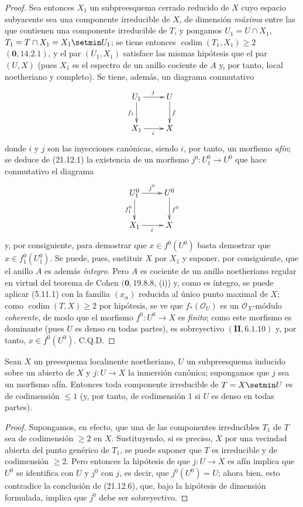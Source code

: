 \begin{proof}
Sea entonces $X_1$ un subpreesquema cerrado reducido de $X$ cuyo espacio subyacente
sea una componente irreducible de $X$, de dimensión \emph{máxima} entre las que
contienen una componente irreducible de $T$, y pongamos
$U_1=U\cap X_1$, $T_1=T\cap X_1=X_1\setmin U_1$; se tiene entonces
$\operatorname{codim}(T_1,X_1)\geq2$ $(\mathbf 0, 14.2.1)$, y el par $(U_1,X_1)$
satisface las mismas hipótesis que el par $(U,X)$ (pues $X_1$ es el espectro de un
anillo cociente de $A$ y, por tanto, local noetheriano y completo). Se tiene, además, un
diagrama conmutativo
\[
  \xymatrix{
    U_1 \ar[r]^j \ar[d]_{f_1} & U \ar[d]^f \\
    X_1 \ar[r]_i & X
  }
\]
donde $i$ y $j$ son las inyecciones canónicas, siendo $i$, por tanto, un morfismo \emph{afín}; se
deduce de (21.12.1) la existencia de un morfismo $j^0:U_1^0\to U^0$ que hace conmutativo el
diagrama
\[
  \xymatrix{
    U_1^0 \ar[r]^{j^0} \ar[d]_{f_1^0} & U^0 \ar[d]^{f^0} \\
    X_1 \ar[r]_i & X
  }
\]
y, por consiguiente, para demostrar que $x\in f^0(U^0)$ basta demostrar que
$x\in f_1^0(U_1^0)$. Se puede, pues, sustituir $X$ por $X_1$ y suponer, por consiguiente,
que el anillo $A$ es además \emph{íntegro}. Pero $A$ es cociente de un
anillo noetheriano regular en virtud del teorema de Cohen $(\mathbf 0, 19.8.8$, (i)) y,
como es íntegro, se puede aplicar (5.11.1) con la familia $(x_\alpha)$ reducida al
único punto maximal de $X$; como $\operatorname{codim}(T,X)\geq2$ por hipótesis, se
ve que $f_*(\mathcal O_U)$ es un $\mathcal O_X$-módulo \emph{coherente}, de modo que el
morfismo $f^0:U^0\to X$ es \emph{finito}; como este morfismo es dominante (pues $U$ es denso en
todas partes), es sobreyectivo $(\mathbf{II}, 6.1.10)$ y, por tanto, $x\in f^0(U^0)$. C.Q.D.
\end{proof}

\begin{corollary}[21.12.7]
\label{IV.21.12.7}
Sean $X$ un preesquema localmente noetheriano, $U$ un subpreesquema inducido sobre un
abierto de $X$ y $j:U\to X$ la inmersión canónica; supongamos que $j$ sea un morfismo
\textup{afín}. Entonces toda componente irreducible de $T=X\setmin U$ es de codimensión $\leq1$
(y, por tanto, de codimensión $1$ si $U$ es denso en todas partes).
\end{corollary}

\begin{proof}
Supongamos, en efecto, que una de las componentes irreducibles $T_1$ de $T$ sea de
codimensión $\geq2$ en $X$. Sustituyendo, si es preciso, $X$ por una vecindad abierta del
punto genérico de $T_1$, se puede suponer que $T$ es irreducible y de codimensión $\geq2$.
Pero entonces la hipótesis
de que $j:U\to X$ es afín implica que $U^0$ se identifica con $U$ y $j^0$ con $j$,
es decir, que $j^0(U^0)=U$; ahora bien, esto contradice la conclusión de (21.12.6), que,
bajo la hipótesis de dimensión formulada, implica que $j^0$ debe ser sobreyectivo.
\end{proof}

